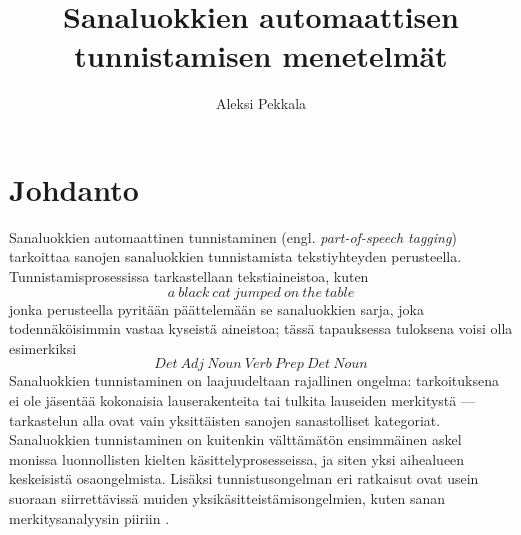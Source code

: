 \documentclass[utf8,bachelor,manualbib]{gradu3}
\begin{document}
\title{Sanaluokkien automaattisen tunnistamisen menetelmät}



\author{Aleksi Pekkala}

\maketitle
  
\mainmatter


\chapter{Johdanto}


Sanaluokkien automaattinen tunnistaminen (engl. \emph{part-of-speech tagging}) tarkoittaa sanojen sanaluokkien tunnistamista tekstiyhteyden perusteella.  Tunnistamisprosessissa tarkastellaan tekstiaineistoa, kuten
\[a\:black\:cat\:jumped\:on\:the\:table\]
jonka perusteella pyritään päättelemään se sanaluokkien sarja, joka todennäköisimmin vastaa kyseistä aineistoa; tässä tapauksessa tuloksena voisi olla esimerkiksi
\[Det\:Adj\:Noun\:Verb\:Prep\:Det\:Noun\]
Sanaluokkien tunnistaminen on laajuudeltaan rajallinen ongelma: tarkoituksena ei ole jäsentää kokonaisia lauserakenteita tai tulkita lauseiden merkitystä --- tarkastelun alla ovat vain yksittäisten sanojen sanastolliset kategoriat. Sanaluokkien tunnistaminen on kuitenkin välttämätön ensimmäinen askel monissa luonnollisten kielten käsittelyprosesseissa, ja siten yksi aihealueen keskeisistä osaongelmista. Lisäksi tunnistusongelman eri ratkaisut ovat usein suoraan siirrettävissä muiden yksikäsitteistämisongelmien, kuten sanan merkitysanalyysin piiriin \citep{brill1995}.
\end{document}
